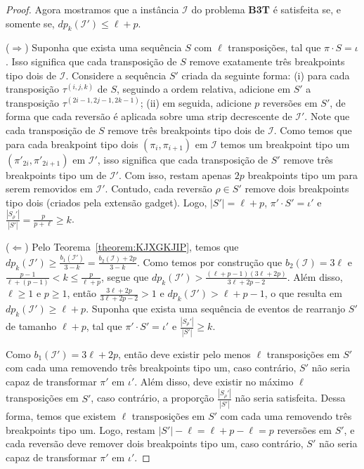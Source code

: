 \begin{proof}
Agora mostramos que a instância $\mathcal{I}$ do problema \textbf{B3T} é satisfeita se, e somente se, $dp_k(\mathcal{I'}) \le \ell+p$.

($\Rightarrow$) Suponha que exista uma sequência $S$ com $\ell$ transposições, tal que $\pi \cdot S = \iota$. Isso significa que cada transposição de $S$ remove exatamente três breakpoints tipo dois de $\mathcal{I}$. Considere a sequência $S'$ criada da seguinte forma: (i) para cada transposição $\tau^{(i,j,k)}$ de $S$, seguindo a ordem relativa, adicione em $S'$ a transposição $\tau^{(2i-1,2j-1,2k-1)}$; (ii) em seguida, adicione $p$ reversões em $S'$, de forma que cada reversão é aplicada sobre uma strip decrescente de $\mathcal{I'}$. Note que cada transposição de $S$ remove três breakpoints tipo dois de $\mathcal{I}$. Como temos que para cada breakpoint tipo dois $(\pi_i,\pi_{i+1})$ em $\mathcal{I}$ temos um breakpoint tipo um $(\pi'_{2i},\pi'_{2i+1})$ em $\mathcal{I'}$, isso significa que cada transposição de $S'$ remove três breakpoints tipo um de $\mathcal{I'}$. Com isso, restam apenas $2p$ breakpoints tipo um para serem removidos em $\mathcal{I'}$. Contudo, cada reversão $\rho \in S'$ remove dois breakpoints tipo dois (criados pela extensão gadget). Logo, $|S'| = \ell+p$, $\pi' \cdot S' = \iota'$ e $\frac{|S_{\rho}'|}{|S'|} = \frac{p}{p+\ell} \ge k$.

($\Leftarrow$) Pelo Teorema~\ref{theorem:KJXGKJIP}, temos que $dp_k(\mathcal{I'}) \ge \frac{b_1(\mathcal{I'})}{3-k} = \frac{b_2(\mathcal{I})+2p}{3-k}$. Como temos por construção que $b_2(\mathcal{I}) = 3\ell$ e $\frac{p-1}{\ell+(p-1)} < k \leq \frac{p}{\ell+p}$, segue que $dp_k(\mathcal{I'}) > \frac{(\ell+p-1)(3\ell+2p)}{3\ell+2p-2}$. Além disso, $\ell \geq 1$ e $p \geq 1$, então $\frac{3\ell+2p}{3\ell+2p-2} > 1$ e $dp_k(\mathcal{I'}) > \ell+p-1$, o que resulta em $dp_k(\mathcal{I'}) \ge \ell + p$. Suponha que exista uma sequência de eventos de rearranjo $S'$ de tamanho $\ell + p$, tal que $\pi' \cdot S' = \iota'$ e $\frac{|S_{\rho}'|}{|S'|} \ge k$.

Como $b_1(\mathcal{I'}) = 3\ell+2p$, então deve existir pelo menos $\ell$ transposições em $S'$ com cada uma removendo três breakpoints tipo um, caso contrário, $S'$ não seria capaz de transformar $\pi'$ em $\iota'$. Além disso, deve existir no máximo $\ell$ transposições em $S'$, caso contrário, a proporção $\frac{|S_{\rho}'|}{|S'|}$ não seria satisfeita. Dessa forma, temos que existem $\ell$ transposições em $S'$ com cada uma removendo três breakpoints tipo um. Logo, restam $|S'| - \ell = \ell+p - \ell = p$ reversões em $S'$, e cada reversão deve remover dois breakpoints tipo um, caso contrário, $S'$ não seria capaz de transformar $\pi'$ em $\iota'$.


\end{proof}
